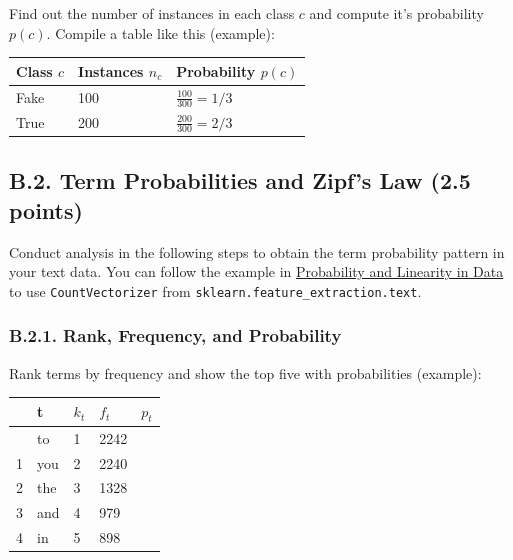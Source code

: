 \documentclass[
  letterpaper,
]{scrbook}
\newcounter{none} %
\begin{document}
Find out the number of instances in each class \(c\) and compute it's
probability \(p(c)\). Compile a table like this (example):

{\def\LTcaptype{none} %
\begin{longtable}[]{@{}lll@{}}
\toprule\noalign{}
Class \(c\) & Instances \(n_c\) & Probability \(p(c)\) \\
\midrule\noalign{}
\endhead
\bottomrule\noalign{}
\endlastfoot
Fake & 100 & \(\frac{100}{300} = 1/3\) \\
True & 200 & \(\frac{200}{300} = 2/3\) \\
\end{longtable}
}

\subsection*{B.2. Term Probabilities and Zipf's Law (2.5
points)}\label{b.2.-term-probabilities-and-zipfs-law-2.5-points}

Conduct analysis in the following steps to obtain the term probability
pattern in your text data. You can follow the example in
\href{../demo/data_prob_linear.html}{Probability and Linearity in Data}
to use \texttt{CountVectorizer} from
\texttt{sklearn.feature\_extraction.text}.

\subsubsection*{B.2.1. Rank, Frequency, and
Probability}\label{b.2.1.-rank-frequency-and-probability}

Rank terms by frequency and show the top five with probabilities
(example):

{\def\LTcaptype{none} %
\begin{longtable}[]{@{}lllll@{}}
\toprule\noalign{}
& t & \(k_t\) & \(f_t\) & \(p_t\) \\
\midrule\noalign{}
\endhead
\bottomrule\noalign{}
\endlastfoot
0 & to & 1 & 2242 & \\
1 & you & 2 & 2240 & \\
2 & the & 3 & 1328 & \\
3 & and & 4 & 979 & \\
4 & in & 5 & 898 & \\
\end{longtable}
}
\end{document}
